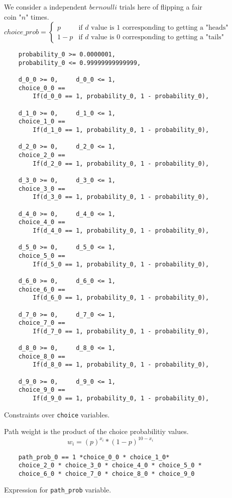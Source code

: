 \documentclass[usenames,dvipsnames,acmsmall]{acmart}
\begin{document}
\begin{figure}
	We consider a independent $bernoulli$ trials here of flipping a fair coin "$n$" times. 
	\[ 
	{choice\_prob} = 
	\begin{cases} 
		p & \textrm{if $d$ value is 1 corresponding to getting a "heads"} \\
		1-p & \textrm{if $d$ value is 0 corresponding to getting a "tails"}
	\end{cases}
	\]
	\begin{verbatim}
	probability_0 >= 0.0000001,
	probability_0 <= 0.99999999999999,
	
	d_0_0 >= 0,		d_0_0 <= 1,
	choice_0_0 ==
		If(d_0_0 == 1, probability_0, 1 - probability_0),
	
	d_1_0 >= 0,		d_1_0 <= 1,
	choice_1_0 ==
		If(d_1_0 == 1, probability_0, 1 - probability_0),
	
	d_2_0 >= 0,		d_2_0 <= 1,
	choice_2_0 ==
		If(d_2_0 == 1, probability_0, 1 - probability_0),
	
	d_3_0 >= 0,		d_3_0 <= 1,
	choice_3_0 ==
		If(d_3_0 == 1, probability_0, 1 - probability_0),
	
	d_4_0 >= 0,		d_4_0 <= 1,
	choice_4_0 ==
		If(d_4_0 == 1, probability_0, 1 - probability_0),
	
	d_5_0 >= 0,		d_5_0 <= 1,
	choice_5_0 ==
		If(d_5_0 == 1, probability_0, 1 - probability_0),
	
	d_6_0 >= 0,		d_6_0 <= 1,
	choice_6_0 ==
		If(d_6_0 == 1, probability_0, 1 - probability_0),
	
	d_7_0 >= 0,		d_7_0 <= 1,
	choice_7_0 ==
		If(d_7_0 == 1, probability_0, 1 - probability_0),
	
	d_8_0 >= 0,		d_8_0 <= 1,
	choice_8_0 ==
		If(d_8_0 == 1, probability_0, 1 - probability_0),
	
	d_9_0 >= 0,		d_9_0 <= 1,
	choice_9_0 ==
		If(d_9_0 == 1, probability_0, 1 - probability_0),
	\end{verbatim}
	\caption{Constraints over \texttt{choice} variables.}
\end{figure}

\begin{figure}
	Path weight is the product of the choice probabilitiy values.
	\begin{equation}
		w_{i} = {(p)^{x_i} * (1-p)^{10-x_i}}
	\end{equation}
	\begin{verbatim}
	path_prob_0 == 1 *choice_0_0 * choice_1_0*
	choice_2_0 * choice_3_0 * choice_4_0 * choice_5_0 *
	choice_6_0 * choice_7_0 * choice_8_0 * choice_9_0
	\end{verbatim}
	\caption{Expression for \texttt{path\_prob} variable.}
\end{figure}
\end{document}
